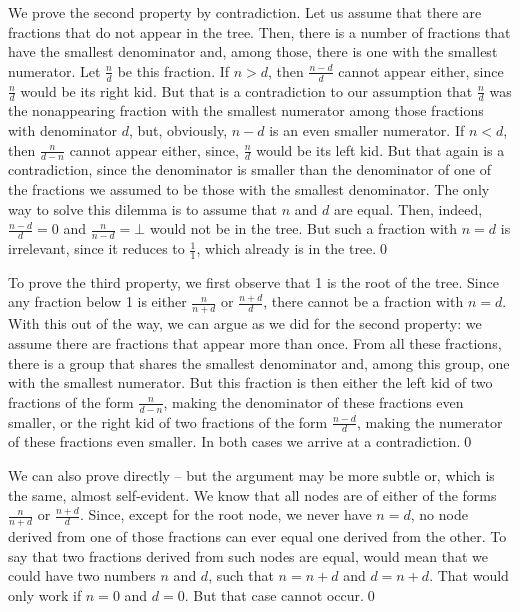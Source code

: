 \documentclass[tikz]{scrreprt}
\begin{document}
We prove the second property by contradiction.
Let us assume that there are fractions 
that do not appear in the tree. 
Then, there is a number of fractions that have
the smallest denominator and, among those,
there is one with the smallest numerator.
Let $\frac{n}{d}$ be this fraction.
If $n>d$, then $\frac{n-d}{d}$ cannot appear either, since
$\frac{n}{d}$ would be its right kid.
But that is a contradiction to our assumption that
$\frac{n}{d}$ was the nonappearing fraction
with the smallest numerator among those fractions
with denominator $d$, but, obviously, $n-d$
is an even smaller numerator.
If $n<d$, then $\frac{n}{d-n}$ cannot appear either, since,
$\frac{n}{d}$ would be its left kid.
But that again is a contradiction, since the denominator
is smaller than the denominator of one of the fractions 
we assumed to be those with the smallest denominator.
The only way to solve this dilemma is
to assume that $n$ and $d$ are equal.
Then, indeed, $\frac{n-d}{d} = 0$ and
$\frac{n}{n-d} = \bot$ would not be in the tree.
But such a fraction with $n=d$ is irrelevant,
since it reduces to $\frac{1}{1}$, 
which already is in the tree.\qed

To prove the third property, we first observe
that 1 is the root of the tree. 
Since any fraction below 1 is either
$\frac{n}{n+d}$ or $\frac{n+d}{d}$,
there cannot be a fraction with $n=d$.
With this out of the way, we can argue 
as we did for the second property:
we assume there are fractions that appear
more than once.
From all these fractions, there is a group 
that shares the smallest denominator and,
among this group, one with the smallest numerator.
But this fraction is then either the left kid
of two fractions of the form $\frac{n}{d-n}$,
making the denominator of these fractions even smaller,
or the right kid of two fractions of the form
$\frac{n-d}{d}$, making the numerator of these fractions
even smaller. In both cases we arrive at a contradiction.\qed

We can also prove directly -- but the argument 
may be more subtle or, which is the same,
almost self-evident.
We know that all nodes are of either of the forms
$\frac{n}{n+d}$ or $\frac{n+d}{d}$.
Since, except for the root node, we never have
$n=d$, no node derived from one of those fractions
can ever equal one derived from the other.
To say that two fractions
derived from such nodes are equal, would mean that
we could have two numbers $n$ and $d$, such that
$n=n+d$ and $d=n+d$. That would only work if
$n=0$ and $d=0$. But that case cannot occur.\qed
\end{document}
